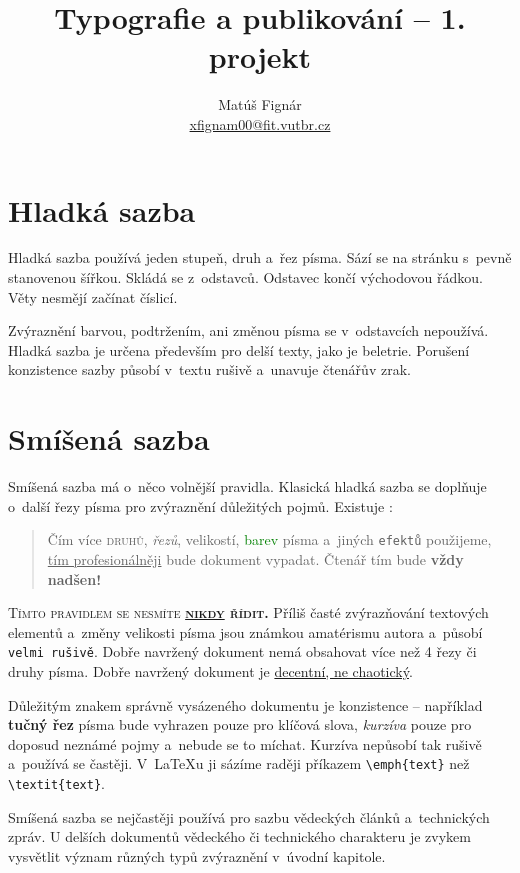 \documentclass[10pt, twocolumn, a4paper]{article}
\title{Typografie a publikování -- 1. projekt}
\author{Matúš Fignár\\ \href{mailto:xfignam00@fit.vut.cz}{xfignam00@fit.vutbr.cz}}
\date{}
\begin{document}
\maketitle

\section{Hladká sazba}
Hladká sazba používá jeden stupeň, druh a~řez písma.
Sází se na stránku s~pevně stanovenou šířkou.
Skládá se z~odstavců. Odstavec končí východovou řádkou.
Věty nesmějí začínat číslicí.

Zvýraznění barvou, podtržením, ani změnou písma se v~odstavcích nepoužívá.
Hladká sazba je určena především pro delší texty, jako je beletrie.
Porušení konzistence sazby působí v~textu rušivě a~unavuje čtenářův zrak.


\section{Smíšená sazba}\label{2}
Smíšená sazba má o~něco volnější pravidla.
Klasická hladká sazba se doplňuje o~další řezy písma pro zvýraznění důležitých pojmů.
Existuje :

\begin{quotation}
    Čím více \textsc{druhů}, \emph{řezů}, {\scriptsize velikostí}, \textcolor{green}{barev} písma a~jiných \texttt{efektů} použijeme, 
    \underline{tím profesionálněji} bude {\selectfont dokument} vypadat.
    Čtenář tím bude \textbf{\LARGE{vždy nadšen!}}
\end{quotation}
\par
\textsc{Tímto pravidlem se nesmíte \textbf{\underline{nikdy} řídit.}}
Příliš časté zvýrazňování textových elementů a~změny {\tiny velikosti} písma jsou známkou amatérismu autora a~působí \texttt{velmi rušivě}.
Dobře navržený dokument nemá obsahovat více než 4 řezy či druhy písma.
Dobře navržený dokument je \underline{decentní, ne chaotický}.
\par
Důležitým znakem správně vysázeného dokumentu je konzistence -- například \textbf{tučný řez} písma bude vyhrazen 
pouze pro klíčová slova, \emph{kurzíva} pouze pro doposud neznámé pojmy a~nebude se to míchat.
Kurzíva nepůsobí tak rušivě a~používá se častěji.
V~\LaTeX{}u ji sázíme raději příkazem \verb|\emph{text}| než \verb|\textit{text}|.
\par
Smíšená sazba se nejčastěji používá pro sazbu vědeckých článků a~technických zpráv.
U delších dokumentů vědeckého či technického charakteru je zvykem vysvětlit význam různých typů zvýraznění v~úvodní kapitole.
\end{document}
